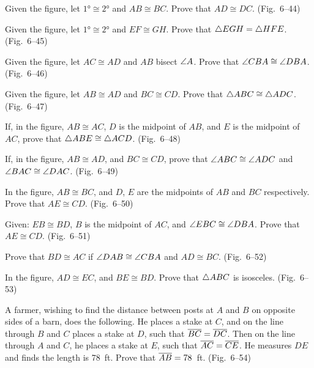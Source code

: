 \documentclass[11pt]{book}
\begin{document}
\begin{exercisecols}
\begin{exlist}
\item Given the figure, let $\ang{1} \cong \ang{2}$ and $AB \cong BC$. Prove
  that $AD \cong DC$. (Fig.~6--44)
\exfig{\FIGVIFORTYFOUR}
\item Given the figure, let $\ang{1} \cong \ang{2}$ and $EF \cong GH$. Prove
  that $\triangle EGH = \triangle HFE$. (Fig.~6--45)
\exfig{\FIGVIFORTYFIVE}
\item Given the figure, let $AC \cong AD$ and $AB$ bisect $\angle A$. Prove that
  $\angle CBA \cong \angle DBA$. (Fig.~6--46)
\exfig{\FIGVIFORTYSIX}
\item Given the figure, let $AB \cong AD$ and $BC \cong CD$. Prove that
  $\triangle ABC \cong \triangle ADC$. (Fig.~6--47)
\exfig{\FIGVIFORTYSEVEN}
\item If, in the figure, $AB \cong AC$, $D$ is the midpoint of $AB$, and $E$ is
  the midpoint of $AC$, prove that $\triangle ABE \cong \triangle ACD$. (Fig.~6--48)
\exfig{\FIGVIFORTYEIGHT}
\item If, in the figure, $AB \cong AD$, and $BC \cong CD$, prove that
  $\angle ABC \cong \angle ADC$ and $\angle BAC \cong \angle DAC$. (Fig.~6--49)
\exfig{\FIGVIFORTYNINE}
\item In the figure, $AB \cong BC$, and $D$, $E$ are the midpoints of $AB$ and
  $BC$ respectively. Prove that $AE \cong CD$. (Fig.~6--50)
\exfig{\FIGVIFIFTY}
\item Given: $EB \cong BD$, $B$ is the midpoint of $AC$, and $\angle EBC \cong
  \angle DBA$. Prove that $AE \cong CD$. (Fig.~6--51)
\exfig{\FIGVIFIFTYONE}
\item Prove that $BD \cong AC$ if $\angle DAB \cong \angle CBA$ and $AD \cong
  BC$. (Fig.~6--52)
\exfig{\FIGVIFIFTYTWO}
\item In the figure, $AD \cong EC$, and $BE \cong BD$. Prove that $\triangle ABC$
  is isosceles. (Fig.~6--53)
\exfig{\FIGVIFIFTYTHREE}
\item A farmer, wishing to find the distance between posts at $A$ and $B$ on
  opposite sides of a barn, does the following. He places a stake at $C$, and
  on the line through $B$ and $C$ places a stake at $D$, such that $\overline{BC} =
  \overline{DC}$. Then on the line through $A$ and $C$, he places a stake at $E$,
  such that $\overline{AC} = \overline{CE}$. He measures $DE$ and finds the length is
  78~ft. Prove that $\overline{AB} = 78$~ft. (Fig.~6--54)
\exfig{\FIGVIFIFTYFOUR}
\end{exlist}
\end{exercisecols}
\end{document}
